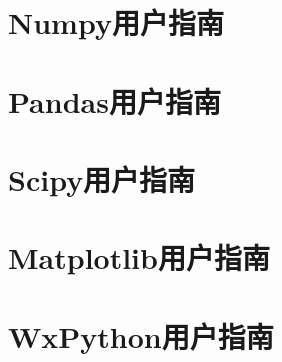 \documentclass{ctexrep}
\begin{document}

\tableofcontents
\part{Numpy用户指南}


\part{Pandas用户指南}
\part{Scipy用户指南}
\part{Matplotlib用户指南}
\part{WxPython用户指南}
\end{document}
